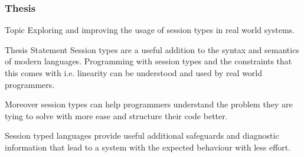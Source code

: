 \label{thesis}
\begin{frame}\frametitle{Thesis}
  \begin{block}{Topic}
    Exploring and improving the usage of session types in real world systems.
  \end{block}
  \begin{alertblock}{Thesis Statement}
    Session types are a useful addition to the syntax and semantics of modern languages. Programming with session types and the constraints that this comes with i.e. linearity can be understood and used by real world programmers.

    Moreover session types can help programmers understand the problem they are tying to solve with more ease and structure their code better.

    Session typed languages provide useful additional safeguards and diagnostic information that lead to a system with the expected behaviour with less effort.
  \end{alertblock}
\end{frame}

